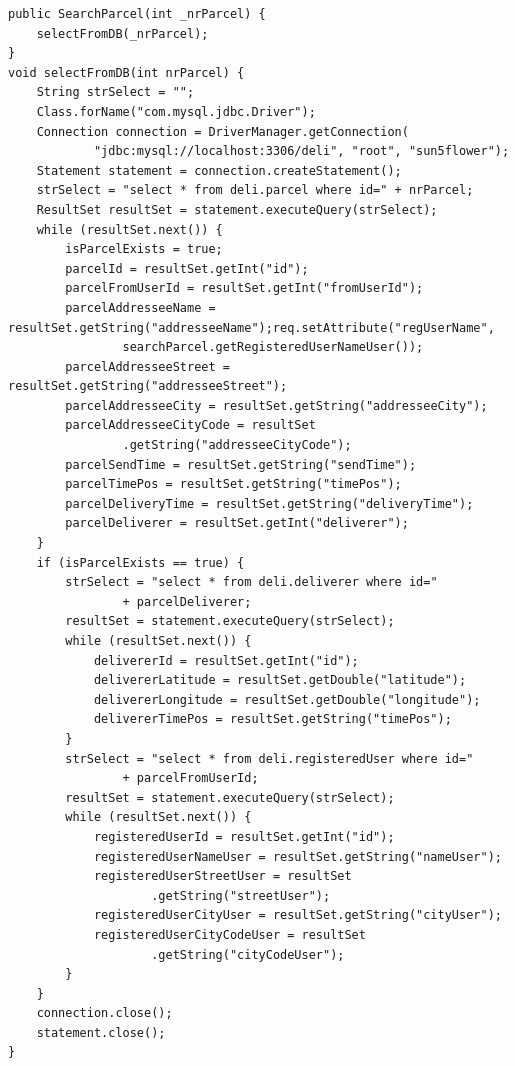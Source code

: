 \documentclass[eng,printmode,oneside]{mgr}
\begin{document}
\begin{lstlisting}[caption=Klasa SearchParcel.java przedstawiona metoda
selectFromDB()\, która reprezentuje połączenie z bazą danych oraz pobiera
wszystkie dane o przesyłce,label=lst:SearchParcel.selectFromDB.java]
public SearchParcel(int _nrParcel) {
	selectFromDB(_nrParcel); 
}
void selectFromDB(int nrParcel) {
	String strSelect = "";
	Class.forName("com.mysql.jdbc.Driver");
	Connection connection = DriverManager.getConnection(
			"jdbc:mysql://localhost:3306/deli", "root", "sun5flower");
	Statement statement = connection.createStatement();
	strSelect = "select * from deli.parcel where id=" + nrParcel;
	ResultSet resultSet = statement.executeQuery(strSelect);
	while (resultSet.next()) {
		isParcelExists = true;
		parcelId = resultSet.getInt("id");
		parcelFromUserId = resultSet.getInt("fromUserId");
		parcelAddresseeName = resultSet.getString("addresseeName");req.setAttribute("regUserName",
				searchParcel.getRegisteredUserNameUser());
		parcelAddresseeStreet = resultSet.getString("addresseeStreet");
		parcelAddresseeCity = resultSet.getString("addresseeCity");
		parcelAddresseeCityCode = resultSet
				.getString("addresseeCityCode");
		parcelSendTime = resultSet.getString("sendTime");
		parcelTimePos = resultSet.getString("timePos");
		parcelDeliveryTime = resultSet.getString("deliveryTime");
		parcelDeliverer = resultSet.getInt("deliverer");
	}
	if (isParcelExists == true) {
		strSelect = "select * from deli.deliverer where id="
				+ parcelDeliverer;
		resultSet = statement.executeQuery(strSelect);
		while (resultSet.next()) {
			delivererId = resultSet.getInt("id");
			delivererLatitude = resultSet.getDouble("latitude");
			delivererLongitude = resultSet.getDouble("longitude");
			delivererTimePos = resultSet.getString("timePos");
		}
		strSelect = "select * from deli.registeredUser where id="
				+ parcelFromUserId;
		resultSet = statement.executeQuery(strSelect);
		while (resultSet.next()) {
			registeredUserId = resultSet.getInt("id");
			registeredUserNameUser = resultSet.getString("nameUser");
			registeredUserStreetUser = resultSet
					.getString("streetUser");
			registeredUserCityUser = resultSet.getString("cityUser");
			registeredUserCityCodeUser = resultSet
					.getString("cityCodeUser");
		}
	}
	connection.close();
	statement.close();
}
\end{lstlisting}
\end{document}
